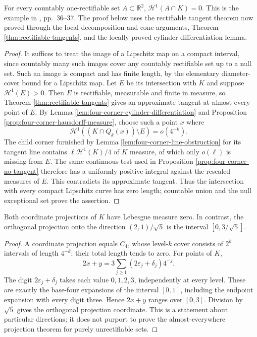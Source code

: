 \begin{theorem}\label{thm:four-corner-pure-unrectifiability}
For every countably one-rectifiable set $A\subset\mathbb R^2$, $\mathcal H^1(A\cap K)=0$. This is the example in \cite{Mor16}, pp.~36--37. The proof below uses the rectifiable tangent theorem now proved through the local decomposition and cone arguments, Theorem \ref{thm:rectifiable-tangents}, and the locally proved cylinder differentiation lemma.
\end{theorem}
\begin{proof}
It suffices to treat the image of a Lipschitz map on a compact interval, since countably many such images cover any countably rectifiable set up to a null set. Such an image is compact and has finite length, by the elementary diameter-cover bound for a Lipschitz map. Let $E$ be its intersection with $K$ and suppose $\mathcal H^1(E)>0$. Then $E$ is rectifiable, measurable and finite in measure, so Theorem \ref{thm:rectifiable-tangents} gives an approximate tangent at almost every point of $E$. By Lemma \ref{lem:four-corner-cylinder-differentiation} and Proposition \ref{prop:four-corner-hausdorff-measure}, choose such a point $x$ where
\[
 \mathcal H^1((K\cap Q_k(x))\setminus E)=o(4^{-k}).
\]
The child corner furnished by Lemma \ref{lem:four-corner-line-obstruction} for its tangent line contains $\ell\mathcal H^1(K)/4$ of $K$ measure, of which only $o(\ell)$ is missing from $E$. The same continuous test used in Proposition \ref{prop:four-corner-no-tangent} therefore has a uniformly positive integral against the rescaled measures of $E$. This contradicts its approximate tangent. Thus the intersection with every compact Lipschitz curve has zero length; countable union and the null exceptional set prove the assertion.
\end{proof}

\begin{example}\label{ex:four-corner-projection-interval}
Both coordinate projections of $K$ have Lebesgue measure zero. In contrast, the orthogonal projection onto the direction $(2,1)/\sqrt5$ is the interval $[0,3/\sqrt5]$.
\end{example}
\begin{proof}
A coordinate projection equals $C_4$, whose level-$k$ cover consists of $2^k$ intervals of length $4^{-k}$; their total length tends to zero. For points of $K$,
\[
 2x+y=3\sum_{j\ge1}(2\varepsilon_j+\delta_j)4^{-j}.
\]
The digit $2\varepsilon_j+\delta_j$ takes each value $0,1,2,3$, independently at every level. These are exactly the base-four expansions of the interval $[0,1]$, including the endpoint expansion with every digit three. Hence $2x+y$ ranges over $[0,3]$. Division by $\sqrt5$ gives the orthogonal projection coordinate. This is a statement about particular directions; it does not purport to prove the almost-everywhere projection theorem for purely unrectifiable sets.
\end{proof}
